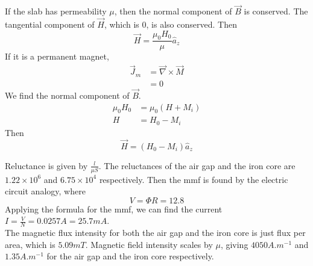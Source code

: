 \documentclass[answers]{exam}
\begin{document}
\begin{questions}
\begin{solution}
    If the slab has permeability $\mu$, then the normal component of $\vec B$ is conserved. The tangential component of $\vec H$, which is 0, is also conserved. Then
    $$\vec H = \frac{\mu_0H_0}{\mu} \hat a_z$$
    If it is a permanent magnet,
    \begin{align*}
        \vec J_m &= \vec\nabla \times \vec M \\
                 &= 0
    \end{align*}
    We find the normal component of $\vec B$.
    \begin{align*}
        \mu_0H_0 &= \mu_0(H+M_i) \\
        H &= H_0 - M_i
    \end{align*}
    Then
    $$\vec H = (H_0-M_i) \hat a_z$$
\end{solution}


\begin{solution}
    Reluctance is given by $\frac{l}{\mu S}$. The reluctances of the air gap and the iron core are $1.22\times10^6$ and $6.75\times10^4$ respectively. Then the mmf is found by the electric circuit analogy, where
    $$V = \Phi R = 12.8$$
    Applying the formula for the mmf, we can find the current $I = \frac{V}{N} = 0.0257\unit{A} = 25.7\unit{mA}$. \\
    The magnetic flux intensity for both the air gap and the iron core is just flux per area, which is $5.09\unit{mT}$. Magnetic field intensity scales by $\mu$, giving $4050\unit{A.m^{-1}}$ and $1.35\unit{A.m^{-1}}$ for the air gap and the iron core respectively.
\end{solution}

\end{questions}
\end{document}

